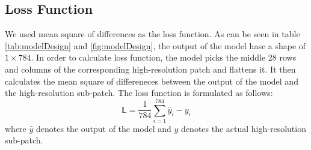 \documentclass{article}
\begin{document}
\subsection{Loss Function}
We used mean square of
differences as the loss function. As can be
seen in table \ref{tab:modelDesign} and 
\ref{fig:modelDesign}, the output of
the model hase a shape of $1 \times 784$.
In order to calculate loss function,
the model picks the middle 28 rows and columns of the
corresponding high-resolution patch and flattens
it. It then calculates the mean square of differeneces
between the output of the model and the high-resolution
sub-patch. The loss function is formulated as follows:
\begin{equation}
    \mathbb{L} = 
    \frac{1}{784}\sum_{i=1}^{784}{\hat{y}_i - y_i}
\end{equation}
where $\hat{y}$ denotes the output of the model and
$y$ denotes the actual high-resolution sub-patch.
\end{document}
